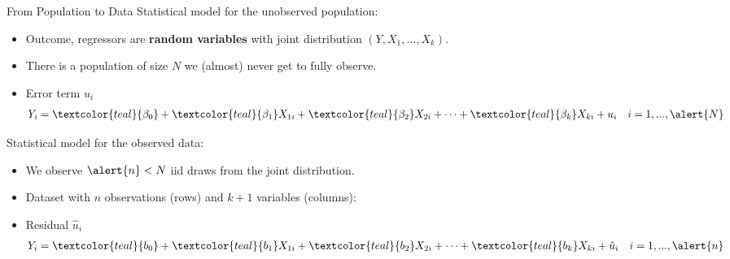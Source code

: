 \documentclass[11pt, aspectratio = 169]{beamer}
\begin{document}
\begin{frame}{From Population to Data}
Statistical model for the unobserved \alert{population}:
\begin{itemize}
    \item Outcome, regressors are \textbf{random variables} with joint distribution $(Y, X_1, …, X_k)$. 
    \item There is a population of size \alert{$N$} we (almost) never get to fully observe.
    \item Error term $u_i$
    \begin{align*}
    Y_i = \textcolor{teal}{\beta_0} + \textcolor{teal}{\beta_1} X_{1i} + \textcolor{teal}{\beta_2} X_{2i} + \cdots + \textcolor{teal}{\beta_k} X_{ki} + u_i \quad i = 1, ..., \alert{N}
    \end{align*}
\end{itemize}
\pause
Statistical model for the observed \alert{data}:
\begin{itemize}
    \item We observe $\alert{n} < N$ iid draws from the joint distribution.
    \item \alert{Dataset} with $n$ observations (rows) and $k+1$ variables (columns):
    \item Residual $\hat{u}_i$
    \begin{align*}
    Y_i = \textcolor{teal}{b_0} + \textcolor{teal}{b_1 }X_{1i} + \textcolor{teal}{b_2} X_{2i} + \cdots + \textcolor{teal}{b_k} X_{ki} + \hat{u}_i \quad i = 1, ..., \alert{n}
    \end{align*}
\end{itemize}

\end{frame}
\end{document}
